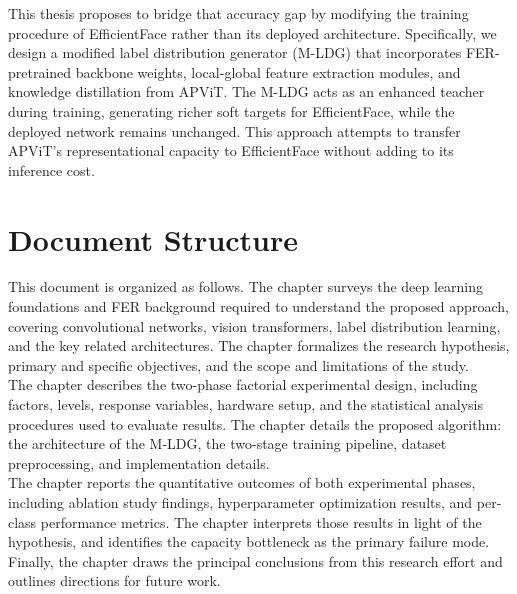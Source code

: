 This thesis proposes to bridge that accuracy gap by modifying the training procedure of EfficientFace rather than its deployed architecture. Specifically, we design a modified label distribution generator (M-LDG) that incorporates FER-pretrained backbone weights, local-global feature extraction modules, and knowledge distillation from APViT. The M-LDG acts as an enhanced teacher during training, generating richer soft targets for EfficientFace, while the deployed network remains unchanged. This approach attempts to transfer APViT's representational capacity to EfficientFace without adding to its inference cost.

\section{Document Structure}

This document is organized as follows. The  chapter surveys the deep learning foundations and FER background required to understand the proposed approach, covering convolutional networks, vision transformers, label distribution learning, and the key related architectures. The  chapter formalizes the research hypothesis, primary and specific objectives, and the scope and limitations of the study.\\

The  chapter describes the two-phase factorial experimental design, including factors, levels, response variables, hardware setup, and the statistical analysis procedures used to evaluate results. The  chapter details the proposed algorithm: the architecture of the M-LDG, the two-stage training pipeline, dataset preprocessing, and implementation details.\\

The  chapter reports the quantitative outcomes of both experimental phases, including ablation study findings, hyperparameter optimization results, and per-class performance metrics. The  chapter interprets those results in light of the hypothesis, and identifies the capacity bottleneck as the primary failure mode.\\

Finally, the  chapter draws the principal conclusions from this research effort and outlines directions for future work.